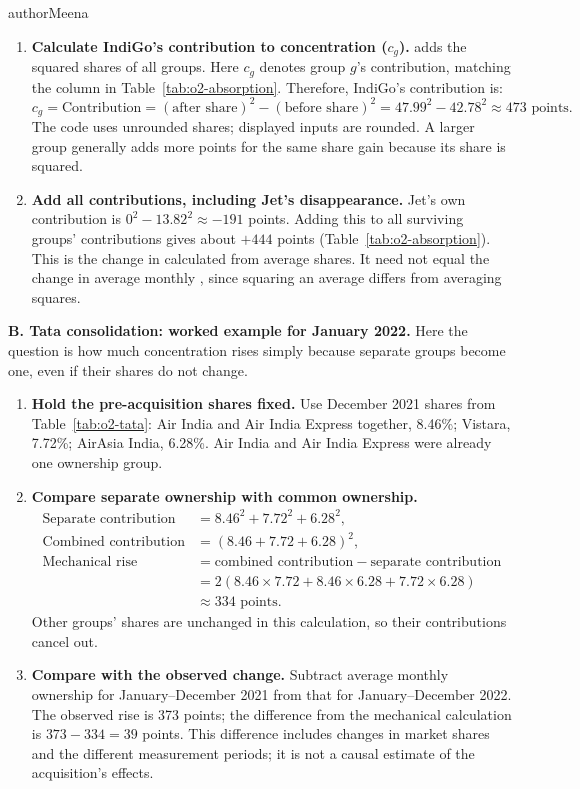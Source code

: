 \begin{mergedcontribution}{authorMeena}
\begin{enumerate}[leftmargin=2em]
	\item \textbf{Calculate IndiGo's contribution to concentration ($c_g$).} \HHI{} adds the squared shares of all groups. Here $c_g$ denotes group $g$'s contribution, matching the column in Table~\ref{tab:o2-absorption}. Therefore, IndiGo's contribution is:
	\[
	c_g = \text{Contribution} = (\text{after share})^2-(\text{before share})^2
	= 47.99^2-42.78^2 \approx 473\text{ points}.
	\]
	The code uses unrounded shares; displayed inputs are rounded. A larger group generally adds more \HHI{} points for the same share gain because its share is squared.

	\item \textbf{Add all contributions, including Jet's disappearance.} Jet's own contribution is $0^2-13.82^2\approx-191$ points. Adding this to all surviving groups' contributions gives about $+444$ points (Table~\ref{tab:o2-absorption}). This is the change in \HHI{} calculated from average shares. It need not equal the change in average monthly \HHI{}, since squaring an average differs from averaging squares.
\end{enumerate}

\textbf{B. Tata consolidation: worked example for January 2022.}
Here the question is how much concentration rises simply because separate groups become one, even if their shares do not change.
\begin{enumerate}[leftmargin=2em]
	\item \textbf{Hold the pre-acquisition shares fixed.} Use December 2021 shares from Table~\ref{tab:o2-tata}: Air India and Air India Express together, 8.46\%; Vistara, 7.72\%; AirAsia India, 6.28\%. Air India and Air India Express were already one ownership group.

	\item \textbf{Compare separate ownership with common ownership.}
	\[
	\begin{aligned}
	\text{Separate contribution} &= 8.46^2+7.72^2+6.28^2,\\
	\text{Combined contribution} &= (8.46+7.72+6.28)^2,\\
	\text{Mechanical rise} &= \text{combined contribution}-\text{separate contribution}\\
	&= 2(8.46\times7.72+8.46\times6.28+7.72\times6.28)\\
	&\approx334\text{ points}.
	\end{aligned}
	\]
	Other groups' shares are unchanged in this calculation, so their contributions cancel out.

	\item \textbf{Compare with the observed change.} Subtract average monthly ownership \HHI{} for January--December 2021 from that for January--December 2022. The observed rise is 373 points; the difference from the mechanical calculation is $373-334=39$ points. This difference includes changes in market shares and the different measurement periods; it is not a causal estimate of the acquisition's effects.
\end{enumerate}


\end{mergedcontribution}
